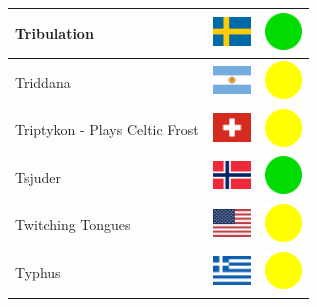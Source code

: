 \documentclass[12pt, a4paper, twoside]{report}
\begin{document}
\begin{center}
\begin{longtable}{|p{5cm}|p{2cm}|p{2cm}|}
 Tribulation                                                & \includegraphics[width=1cm]{../img/flags/se} &   \includegraphics[width=1cm]{../likes/y} \\ \hline
 Triddana                                                   & \includegraphics[width=1cm]{../img/flags/ar} &   \includegraphics[width=1cm]{../likes/m} \\ \hline
 Triptykon - Plays Celtic Frost                             & \includegraphics[width=1cm]{../img/flags/ch} &   \includegraphics[width=1cm]{../likes/m} \\ \hline
 Tsjuder                                                    & \includegraphics[width=1cm]{../img/flags/no} &   \includegraphics[width=1cm]{../likes/y} \\ \hline
 Twitching Tongues                                          & \includegraphics[width=1cm]{../img/flags/us} &   \includegraphics[width=1cm]{../likes/m} \\ \hline
 Typhus                                                     & \includegraphics[width=1cm]{../img/flags/gr} &   \includegraphics[width=1cm]{../likes/m} \\ \hline

\end{longtable}
\end{center}
\end{document}
